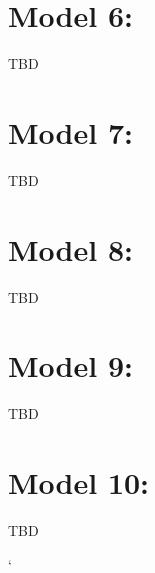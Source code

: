 \documentclass[12pt, letterpaper]{article}
\begin{document}
\section{Model 6:} 
TBD


\section{Model 7:}
TBD


\section{Model 8:} 
TBD


\section{Model 9:} 
TBD


\section{Model 10:} 
TBD

    `
\end{document}
